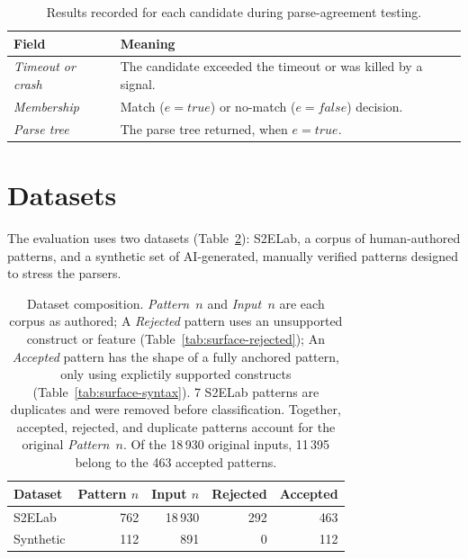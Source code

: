 \begin{table}[ht]
\centering
\small
\renewcommand{\arraystretch}{1.15}
\begin{tabularx}{\textwidth}{@{}l >{\raggedright\arraybackslash}X@{}}
\textbf{Field} & \textbf{Meaning} \\
\hline
\emph{Timeout or crash} & The candidate exceeded the timeout or was killed by a signal. \\
\emph{Membership} & Match ($e = \mathit{true}$) or no-match ($e = \mathit{false}$) decision. \\
\emph{Parse tree} & The parse tree returned, when $e = \mathit{true}$. \\
\end{tabularx}
\caption{Results recorded for each candidate during parse-agreement testing.}
\label{tab:eval-agreement-fields}
\end{table}

%
%
%

\clearpage
\section{Datasets}
\label{sec:eval-dataset}

The evaluation uses two datasets (Table~\ref{tab:dataset-summary}): 
S2ELab, a corpus of human-authored patterns, 
and a synthetic set of AI-generated, 
manually verified patterns designed to stress the parsers.

\begin{table}[H]
\centering
\small
\setlength{\tabcolsep}{4pt}
\begin{tabular*}{\textwidth}{@{\extracolsep{\fill}} lrrrr}
\hline
Dataset & Pattern $n$ & Input $n$ & Rejected & Accepted \\
\hline
S2ELab     &  762 & 18\,930 & 292 & 463 \\
Synthetic  &  112 &    891  &   0 & 112 \\
\hline
\end{tabular*}
\caption{Dataset composition. \emph{Pattern~$n$} and \emph{Input~$n$} are
each corpus as authored; A \emph{Rejected} pattern uses
an unsupported construct or feature (Table~\ref{tab:surface-rejected}); 
An \emph{Accepted} pattern has the shape of a fully anchored pattern,
only using explictily supported constructs (Table~\ref{tab:surface-syntax}). 
7 S2ELab patterns are duplicates and were removed before classification.
Together, accepted, rejected, and duplicate patterns
account for the original \emph{Pattern~$n$}.
Of the 18\,930 original inputs, 11\,395 belong
to the 463 accepted patterns.}
\label{tab:dataset-summary}
\end{table}

